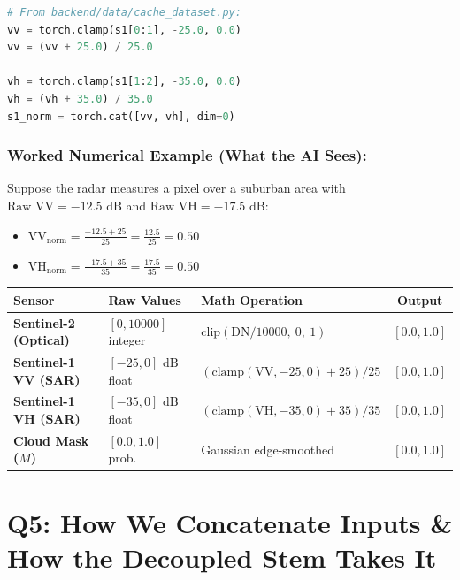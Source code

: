 \documentclass[11pt,a4paper]{article}
\begin{document}
\begin{lstlisting}[language=Python]
# From backend/data/cache_dataset.py:
vv = torch.clamp(s1[0:1], -25.0, 0.0)
vv = (vv + 25.0) / 25.0

vh = torch.clamp(s1[1:2], -35.0, 0.0)
vh = (vh + 35.0) / 35.0
s1_norm = torch.cat([vv, vh], dim=0)
\end{lstlisting}

\subsubsection*{Worked Numerical Example (What the AI Sees):}
Suppose the radar measures a pixel over a suburban area with $\text{Raw VV} = -12.5\text{ dB}$ and $\text{Raw VH} = -17.5\text{ dB}$:
\begin{itemize}[leftmargin=1.5em]
    \item $\text{VV}_{\text{norm}} = \frac{-12.5 + 25}{25} = \frac{12.5}{25} = \mathbf{0.50}$
    \item $\text{VH}_{\text{norm}} = \frac{-17.5 + 35}{35} = \frac{17.5}{35} = \mathbf{0.50}$
\end{itemize}

\begin{center}
\begin{tabularx}{\textwidth}{llXc}
\toprule
\textbf{Sensor} & \textbf{Raw Values} & \textbf{Math Operation} & \textbf{Output} \\
\midrule
\textbf{Sentinel-2 (Optical)} & $[0, 10000]$ integer & $\text{clip}(\text{DN} / 10000,\ 0,\ 1)$ & $[0.0, 1.0]$ \\
\textbf{Sentinel-1 VV (SAR)} & $[-25, 0]\text{ dB}$ float & $(\text{clamp}(\text{VV}, -25, 0) + 25) / 25$ & $[0.0, 1.0]$ \\
\textbf{Sentinel-1 VH (SAR)} & $[-35, 0]\text{ dB}$ float & $(\text{clamp}(\text{VH}, -35, 0) + 35) / 35$ & $[0.0, 1.0]$ \\
\textbf{Cloud Mask ($M$)} & $[0.0, 1.0]$ prob. & Gaussian edge-smoothed & $[0.0, 1.0]$ \\
\bottomrule
\end{tabularx}
\end{center}

\bigskip

\section{Q5: How We Concatenate Inputs \& How the Decoupled Stem Takes It}
\end{document}
